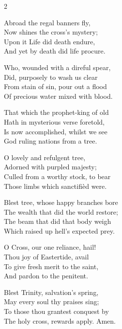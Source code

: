 \begin{multicols}{2}
\raggedcolumns
\begin{enpars}
Abroad the regal banners fly,\\
Now shines the cross’s mystery;\\
Upon it Life did death endure,\\
And yet by death did life procure.

Who, wounded with a direful spear,\\
Did, purposely to wash us clear\\
From stain of sin, pour out a flood\\
Of precious water mixed with blood.

That which the prophet-king of old\\
Hath in mysterious verse foretold,\\
Is now accomplished, whilst we see\\
God ruling nations from a tree.

O lovely and refulgent tree,\\
Adorned with purpled majesty;\\
Culled from a worthy stock, to bear\\
Those limbs which sanctifièd were.

Blest tree, whose happy branches bore\\
The wealth that did the world restore;\\
The beam that did that body weigh\\
Which raised up hell’s expected prey.

O Cross, our one reliance, hail!\\
Thou joy of Eastertide, avail\\
To give fresh merit to the saint,\\
And pardon to the penitent.

Blest Trinity, salvation’s spring,\\
May every soul thy praises sing;\\
To those thou grantest conquest by\\
The holy cross, rewards apply. Amen.
\end{enpars}\end{multicols}